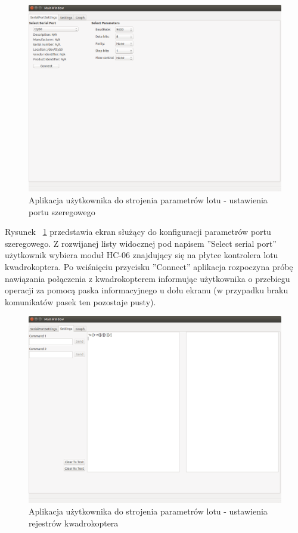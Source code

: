 \begin{figure}[H]
	\centering
	\includegraphics[scale=0.4]{Pictures/QuadroTune/QuadroTuneSerialSettings.png}
	\caption[Aplikacja użytkownika do strojenia parametrów lotu - ustawienia portu szeregowego]{Aplikacja użytkownika do strojenia parametrów lotu - ustawienia portu szeregowego}
	\label{fig:QuadroTune_screen1}
\end{figure}

Rysunek ~\ref{fig:QuadroTune_screen1} przedstawia ekran służący do konfiguracji parametrów portu szeregowego. Z rozwijanej listy widocznej pod napisem ''Select serial port'' użytkownik wybiera moduł HC-06 znajdujący się na płytce kontrolera lotu kwadrokoptera. Po wciśnięciu przycisku ''Connect'' aplikacja rozpoczyna próbę nawiązania połączenia z kwadrokopterem informując użytkownika o przebiegu operacji za pomocą paska informacyjnego u dołu ekranu (w przypadku braku komunikatów pasek ten pozostaje pusty).

\begin{figure}[H]
	\centering
	\includegraphics[scale=0.4]{Pictures/QuadroTune/QuadroTuneSettings.png}
	\caption[Aplikacja użytkownika do strojenia parametrów lotu - ustawienia rejestrów kwadrokoptera]{Aplikacja użytkownika do strojenia parametrów lotu - ustawienia rejestrów kwadrokoptera}
	\label{fig:QuadroTune_screen2}
\end{figure}

